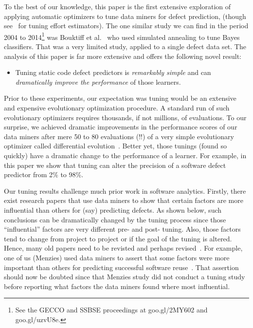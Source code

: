 \documentclass{sig-alternative}
\newcommand{\bi}{\begin{itemize}[leftmargin=0.4cm]}
\newcommand{\ei}{\end{itemize}}
\begin{document}
To the best of our knowledge, this paper is the first extensive exploration 
of applying automatic optimizers to tune data miners for defect prediction,
(though see~\cite{cora10,balogh12,Minku13,minku13z} for tuning effort estimators).
The one similar study  we can find in the period 2004 to 2014\footnote{See the GECCO and SSBSE proceedings at    goo.gl/2MY602 and goo.gl/uzvU8e.} was
Bouktiff et al.~\cite{Bouktif06} who used  simulated annealing to tune Bayes classifiers.
That was a very limited study, applied to a  single defect data set.
The analysis of this paper is far more extensive and offers the following novel result:
\bi
\item
Tuning static code defect predictors is {\em remarkably simple} and can {\em dramatically improve the performance}
of those learners. 
\ei
Prior to these experiments, our expectation was tuning
would be an  extensive and expensive evolutionary optimization procedure. 
A standard run of such evolutionary optimizers requires   thousands,
if not millions, of evaluations.
To
our surprise, we achieved dramatic improvements in the performance scores
of our data miners after  mere 50 to 80 evaluations (!!) of a very simple evolutionary 
optimizer  called differential evolution~\cite{storn1997differential}.
Better yet,  those  tunings (found so quickly)   
  have a dramatic change to the performance of a learner. For example,
in this paper we show that tuning can alter the precision of
a software defect predictor from 2\% to 98\%.

Our tuning results  challenge much prior work in software analytics. 
Firstly, there exist research papers
that use data miners to   show that certain factors
are more influential than others for (say)
predicting defects. As shown below, such conclusions can be dramatically
changed by the tuning process since those  ``influential'' factors are very different pre- and post- tuning. Also, those factors tend to  change from project to project or if the goal
of the tuning is altered.
Hence, many old papers    need to be revisted  and perhaps revised~\cite{bell2013limited,rahman2013how,me02k,moser2008comparative,zimmermann2007predicting,herzig2013predicting}.  
For example, one of us (Menzies) used data miners
to assert that some factors were more important than others for predicting
successful software reuse~\cite{me02k}. That assertion should now be doubted since that
Menzies study did not conduct a tuning study before reporting what factors the data miners
found where most influential.
\end{document}
